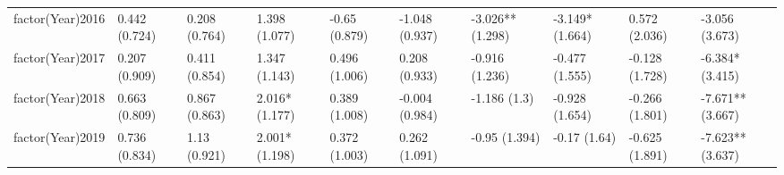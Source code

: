 \begin{table}[ht]
\begin{tabular}{llllllllll}
  factor(Year)2016 & 0.442 (0.724) & 0.208 (0.764) & 1.398 (1.077) & -0.65 (0.879) & -1.048 (0.937) & -3.026** (1.298) & -3.149* (1.664) & 0.572 (2.036) & -3.056 (3.673) \\ 
  factor(Year)2017 & 0.207 (0.909) & 0.411 (0.854) & 1.347 (1.143) & 0.496 (1.006) & 0.208 (0.933) & -0.916 (1.236) & -0.477 (1.555) & -0.128 (1.728) & -6.384* (3.415) \\ 
  factor(Year)2018 & 0.663 (0.809) & 0.867 (0.863) & 2.016* (1.177) & 0.389 (1.008) & -0.004 (0.984) & -1.186 (1.3) & -0.928 (1.654) & -0.266 (1.801) & -7.671** (3.667) \\ 
  factor(Year)2019 & 0.736 (0.834) & 1.13 (0.921) & 2.001* (1.198) & 0.372 (1.003) & 0.262 (1.091) & -0.95 (1.394) & -0.17 (1.64) & -0.625 (1.891) & -7.623** (3.637) \\ 
   \bottomrule
\end{tabular}
\endgroup
\end{table}
